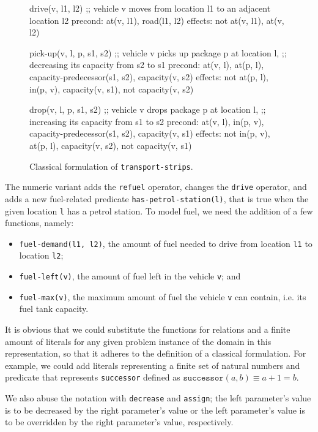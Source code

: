 \begin{figure}[tb]
\begin{code}
drive(v, l1, l2)
  ;; vehicle v moves from location l1 to an adjacent location l2
  precond: at(v, l1), road(l1, l2)
  effects: not at(v, l1), at(v, l2)

pick-up(v, l, p, s1, s2)
  ;; vehicle v picks up package p at location l,
  ;; decreasing its capacity from s2 to s1
  precond: at(v, l), at(p, l), capacity-predecessor(s1, s2),
           capacity(v, s2)
  effects: not at(p, l), in(p, v), capacity(v, s1),
           not capacity(v, s2)
  
drop(v, l, p, s1, s2)
  ;; vehicle v drops package p at location l,
  ;; increasing its capacity from s1 to s2
  precond: at(v, l), in(p, v), capacity-predecessor(s1, s2),
           capacity(v, s1)
  effects: not in(p, v), at(p, l), capacity(v, s2),
           not capacity(v, s1)
\end{code}
\caption{Classical formulation of \texttt{transport-strips}.}
\label{code:classical-strips}
\end{figure}

The numeric variant  adds the \verb+refuel+ operator, changes the \verb+drive+
operator, and adds a new fuel-related predicate \verb+has-petrol-station(l)+, that is true when the given location \verb+l+ has
a petrol station.
To model fuel, we need the addition of a few functions, namely:

\begin{itemize}
\item \verb+fuel-demand(l1, l2)+, the amount of fuel needed to drive
from location \verb+l1+ to location \verb+l2+;
\item \verb+fuel-left(v)+, the amount of fuel left in
the vehicle \verb+v+; and
\item \verb+fuel-max(v)+, the maximum amount of fuel
the vehicle \verb+v+ can contain, i.e. its fuel tank capacity.
\end{itemize}

It is obvious that we could substitute the functions for relations
and a finite amount of literals for any given problem instance of
the domain in this representation,
so that it adheres to the definition of a classical formulation.
For example, we could add literals representing a finite set of
natural numbers and predicate that represents
\verb+successor+ defined as $\texttt{successor}(a, b) \equiv a + 1 = b$.

We also abuse the notation with \verb+decrease+ and \verb+assign+;
the left parameter's value is to be decreased by the right
parameter's value or the left parameter's value is to be overridden
by the right parameter's value, respectively.


